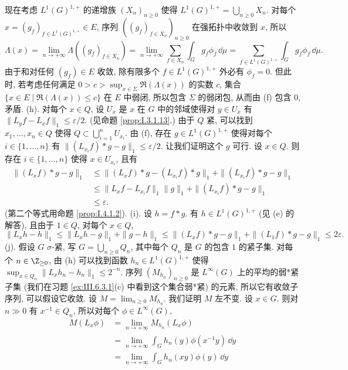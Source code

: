 \begin{solution}
现在考虑 $L^1(G)^{1,+}$ 的递增族 $(X_n)_{n \geq 0}$ 使得 $L^1(G)^{1,+} = \bigcup_{n \geq 0}X_n$. 对每个 $x = (g_f)_{f \in L^1(G)^{1,+}} \in E$, 序列 $((g_f)_{f \in X_n})_{n \geq 0}$ 在强拓扑中收敛到 $x$, 所以
\[
\Lambda(x) = \lim_{n \to +\infty}\Lambda((g_f)_{f \in X_n}) = \lim_{n \to +\infty}\sum_{f \in X_n}\int_G g_f\phi_f\,\dd\mu = \sum_{f \in L^1(G)^{1,+}}\int_G g_f\phi_f\,\dd\mu.
\]
由于和对任何 $(g_f) \in E$ 收敛, 除有限多个 $f \in L^1(G)^{1,+}$ 外必有 $\phi_f = 0$.
但此时, 若考虑任何满足 $0 > c > \sup_{x \in \Sigma}\Re(\Lambda(x))$ 的实数 $c$, 集合 $\{x \in E \mid \Re(\Lambda(x)) \leq c\}$ 在 $E$ 中弱闭, 所以包含 $\Sigma$ 的弱闭包, 从而由 (f) 包含 $0$, 矛盾.
(h). 对每个 $x \in Q$, 设 $U_x$ 是 $x$ 在 $G$ 中的邻域使得对 $y \in U_x$ 有 $\|L_yf - L_xf\|_1 \leq \varepsilon/2$. (见命题 \ref{prop:I.3.1.13}.) 由于 $Q$ 紧, 可以找到 $x_1, \ldots, x_n \in Q$ 使得 $Q \subset \bigcup_{i=1}^n U_{x_i}$. 由 (f), 存在 $g \in L^1(G)^{1,+}$ 使得对每个 $i \in \{1, \ldots, n\}$ 有 $\|(L_{x_i}f) * g - g\|_1 \leq \varepsilon/2$.
让我们证明这个 $g$ 可行. 设 $x \in Q$. 则存在 $i \in \{1, \ldots, n\}$ 使得 $x \in U_{x_i}$, 且有
\begin{align*}
\|(L_xf) * g - g\|_1 &\leq \|(L_xf) * g - (L_{x_i}f) * g\|_1 + \|(L_{x_i}f) * g - g\|_1 \\
&\leq \|L_xf - L_{x_i}f\|_1\|g\|_1 + \|(L_{x_i}f) * g - g\|_1 \\
&\leq \varepsilon.
\end{align*}
(第二个等式用命题 \ref{prop:I.4.1.2}).
(i). 设 $h = f * g$. 有 $h \in L^1(G)^{1,+}$ (见 (e) 的解答), 且由于 $1 \in Q$, 对每个 $x \in Q$,
\[
\|L_xh - h\|_1 \leq \|L_xh - g\|_1 + \|g - h\|_1 \leq \|(L_xf) * g - g\|_1 + \|(L_1f) * g - g\|_1 \leq 2\varepsilon.
\]
(j). 假设 $G$ $\sigma$-紧, 写 $G = \bigcup_{n \geq 0}Q_n$, 其中每个 $Q_n$ 是 $G$ 的包含 $1$ 的紧子集. 对每个 $n \in \Z_{\geq 0}$, 由 (h) 可以找到函数 $h_n \in L^1(G)^{1,+}$ 使得 $\sup_{x \in Q_n}\|L_xh_n - h_n\|_1 \leq 2^{-n}$. 序列 $(M_{h_n})_{n \geq 0}$ 是 $L^{\infty}(G)$ 上的平均的弱*紧子集 (我们在习题 \ref{ex:III.6.3.1}(c) 中看到这个集合弱*紧) 的元素, 所以它有收敛子序列, 可以假设它收敛. 设 $M = \lim_{n \geq 0}M_{h_n}$. 我们证明 $M$ 左不变. 设 $x \in G$. 则对 $n \gg 0$ 有 $x^{-1} \in Q_n$, 所以对每个 $\phi \in L^{\infty}(G)$,
\begin{align*}
M(L_x\phi) &= \lim_{n \to +\infty}M_{h_n}(L_x\phi) \\
&= \lim_{n \to +\infty}\int_G h_n(y)\phi(x^{-1}y)\,\dd y \\
&= \lim_{n \to +\infty}\int_G h_n(xy)\phi(y)\,\dd y \\

\end{align*}
\end{solution}
